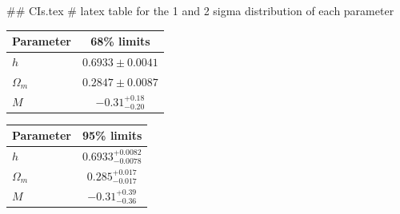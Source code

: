 ## CIs.tex
# latex table for the 1 and 2 sigma distribution of each parameter

\begin{tabular} { l  c}
 Parameter &  68\% limits\\
\hline
{\boldmath$h              $} & $0.6933\pm 0.0041          $\\
{\boldmath$\Omega_m       $} & $0.2847\pm 0.0087          $\\
{\boldmath$M              $} & $-0.31^{+0.18}_{-0.20}     $\\
\hline
\end{tabular}

\begin{tabular} { l  c}
 Parameter &  95\% limits\\
\hline
{\boldmath$h              $} & $0.6933^{+0.0082}_{-0.0078}$\\
{\boldmath$\Omega_m       $} & $0.285^{+0.017}_{-0.017}   $\\
{\boldmath$M              $} & $-0.31^{+0.39}_{-0.36}     $\\
\hline
\end{tabular}
